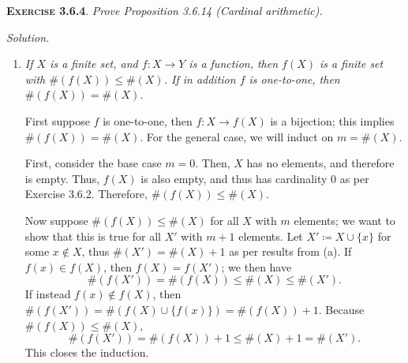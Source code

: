 \documentclass[12pt]{article}
\theoremstyle{remark}
\newenvironment{exer}[2]{
    \noindent \setlength{\parskip}{1em}%
    \textsc{\textbf{Exercise #1}}. \textit{#2} \par
    \noindent \textit{Solution.} %
}{\bigskip}
\begin{document}
\begin{exer}{3.6.4}{
    Prove Proposition 3.6.14 (Cardinal arithmetic).
}
\begin{enumerate}[topsep=0mm,label=(\alph*)]
            Because $X$ is finite, we have $\#(X) = m$, $m \in \mathbb{N}$.
            We apply induction on $m$.
            For the base case, when $m = 0$, $X = \varnothing$.
            The only subset of $X$ is the empty set itself, which also has cardinality $0$.
            Thus, $Y$ is finite, and $\#(Y) \le \#(X)$.

            Now, assume inductively that $\#(Y) \le \#(X)$ for all $X$ with $m$ elements; we want to show this is also true for all $X'$ with $m + 1$ elements.
            Let $X' \coloneqq X \cup \{ x \}$ for some $x \notin X$, thus $\#(X') = \#(X) + 1$ as per results from (a).
            If $x \notin Y$, then $Y \subseteq X$, which has cardinality $n$, so the statement is true by the inductive hypothesis.
            If instead $x \in Y$, then $Y = (Y \setminus \{ x \}) \cup \{ x \}$.
            Because $Y \setminus \{ x \} \in X$, $Y \setminus \{ x \}$ is finite by the inductive hypothesis.
            Then, from results in (a), we have $\#(Y) = \#(Y \setminus \{ x \}) + 1$.
            Hence, $\#(Y) = \#(Y \setminus \{ x \}) + 1 \le \#(X) + 1 = \#(X')$.            

        \item \textit{%
            If $X$ is a finite set, and $f : X \to Y$ is a function, then $f(X)$ is a finite set with $\#(f(X)) \le \#(X)$.
            If in addition $f$ is one-to-one, then $\#(f(X)) = \#(X)$.
        }

            First suppose $f$ is one-to-one, then $f : X \to f(X)$ is a bijection; this implies $\#(f(X)) = \#(X)$.
            For the general case, we will induct on $m = \#(X)$.

            First, consider the base case $m = 0$.
            Then, $X$ has no elements, and therefore is empty.
            Thus, $f(X)$ is also empty, and thus has cardinality $0$ as per Exercise 3.6.2.
            Therefore, $\#(f(X)) \le \#(X)$.

            Now suppose $\#(f(X)) \le \#(X)$ for all $X$ with $m$ elements; we want to show that this is true for all $X'$ with $m + 1$ elements.
            Let $X' \coloneqq X \cup \{ x \}$ for some $x \notin X$, thus $\#(X') = \#(X) + 1$ as per results from (a).
            If $f(x) \in f(X)$, then $f(X) = f(X')$; we then have
            \[
                \#(f(X')) = \#(f(X)) \le \#(X) \le \#(X').
            \]
            If instead $f(x) \notin f(X)$, then $\#(f(X')) = \#(f(X) \cup \{f(x)\}) = \#(f(X)) + 1$.
            Because $\#(f(X)) \le \#(X)$,
            \[
                \#(f(X')) = \#(f(X)) + 1 \le \#(X) + 1 = \#(X').
            \]
            This closes the induction.
        

\end{enumerate}
\end{exer}
\end{document}
